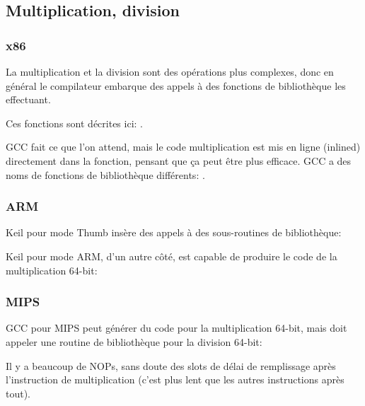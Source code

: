 ﻿\subsection{Multiplication, division}



\subsubsection{x86}



La multiplication et la division sont des opérations plus complexes, donc en général
le compilateur embarque des appels à des fonctions de bibliothèque les effectuant.

Ces fonctions sont décrites ici: .



GCC fait ce que l'on attend, mais le code multiplication est mis en ligne (inlined)
directement dans la fonction, pensant que ça peut être plus efficace.
GCC a des noms de fonctions de bibliothèque différents: .

\subsubsection{ARM}

Keil pour mode Thumb insère des appels à des sous-routines de bibliothèque:



Keil pour mode ARM, d'un autre côté, est capable de produire le code de la multiplication
64-bit:



\subsubsection{MIPS}

GCC \Optimizing pour MIPS peut générer du code pour la multiplication 64-bit, mais
doit appeler une routine de bibliothèque pour la division 64-bit:



Il y a beaucoup de \ac{NOP}s, sans doute des slots de délai de remplissage après
l'instruction de multiplication (c'est plus lent que les autres instructions après
tout).

